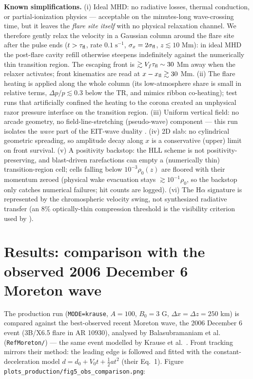 \documentclass[11pt,a4paper]{article}
\begin{document}
\medskip\noindent
\textbf{Known simplifications.}
(i) Ideal MHD: no radiative losses, thermal conduction, or partial-ionization physics ---
acceptable on the minutes-long wave-crossing time, but it leaves the \emph{flare site
itself} with no physical relaxation channel. We therefore gently relax the velocity in a
Gaussian column around the flare site after the pulse ends ($t>\tau_{\rm fl}$, rate
$0.1\;\mathrm{s^{-1}}$, $\sigma_x=2\sigma_{\rm fl}$, $z\lesssim10$ Mm): in ideal MHD the
post-flare cavity refill otherwise steepens indefinitely against the numerically thin
transition region. The escaping front is $\gtrsim V_f\tau_{\rm fl}\sim30$ Mm away when
the relaxer activates; front kinematics are read at $x-x_{\rm fl}\gtrsim30$ Mm.
(ii) The flare heating is applied along the whole column (its low-atmosphere share is
small in relative terms, $\Delta p/p\lesssim0.3$ below the TR, and mimics ribbon
co-heating); test runs that artificially confined the heating to the corona created an
unphysical razor pressure interface on the transition region.
(iii) Uniform vertical field: no arcade geometry, no field-line-stretching (pseudo-wave)
component --- this run isolates the \emph{wave} part of the EIT-wave duality
\cite{Chen2002,Warmuth2015}.
(iv) 2D slab: no cylindrical geometric spreading, so amplitude decay along $x$ is a
conservative (upper) limit on front survival.
(v) A positivity backstop: the HLL scheme is not positivity-preserving, and
blast-driven rarefactions can empty a (numerically thin) transition-region cell; cells
falling below $10^{-3}\rho_0(z)$ are floored with their momentum zeroed (physical wake
evacuation stays $\gtrsim10^{-1}\rho_0$, so the backstop only catches numerical
failures; hit counts are logged).
(vi) The H$\alpha$ signature is represented by the chromospheric velocity swing, not
synthesized radiative transfer (an 8\% optically-thin compression threshold is the
visibility criterion used by \cite{Krause2015}).



\section{Results: comparison with the observed 2006 December 6 Moreton wave}

The production run (\texttt{MODE=krause}, $A=100$, $B_0=3$ G, $\Delta x=\Delta z=250$ km)
is compared against the best-observed recent Moreton wave, the 2006 December 6 event
(3B/X6.5 flare in AR 10930), analysed by Balasubramaniam et al.\ \cite{Bala2010}
(\texttt{RefMoreton/}) --- the same event modelled by Krause et al.\ \cite{Krause2015}.
Front tracking mirrors their method: the leading edge is followed and fitted with the
constant-deceleration model $d=d_0+V_0t+\tfrac12at^2$ (their Eq.~1). Figure
\texttt{plots\_production/fig5\_obs\_comparison.png}:
\end{document}
